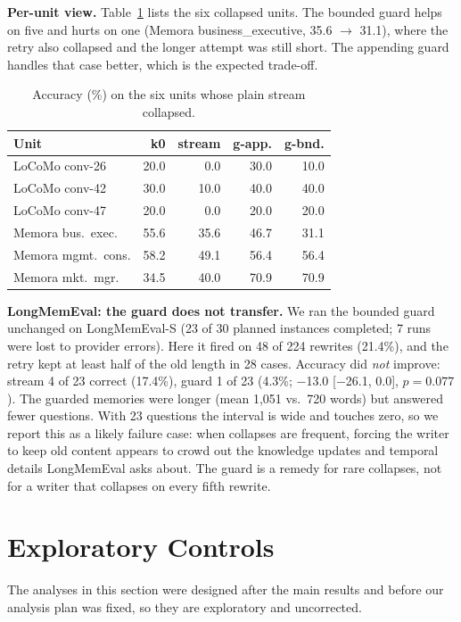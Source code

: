 \documentclass[11pt]{article}
\begin{document}
\textbf{Per-unit view.} Table~\ref{tab:units} lists the six collapsed units. The bounded guard helps on five and hurts on one (Memora business\_executive, 35.6 $\rightarrow$ 31.1), where the retry also collapsed and the longer attempt was still short. The appending guard handles that case better, which is the expected trade-off.

\begin{table}[t]
\centering\small
\setlength{\tabcolsep}{3.5pt}
\begin{tabular}{lrrrr}
\toprule
Unit & k0 & stream & g-app. & g-bnd. \\
\midrule
LoCoMo conv-26 & 20.0 & 0.0 & 30.0 & 10.0 \\
LoCoMo conv-42 & 30.0 & 10.0 & 40.0 & 40.0 \\
LoCoMo conv-47 & 20.0 & 0.0 & 20.0 & 20.0 \\
Memora bus.\ exec. & 55.6 & 35.6 & 46.7 & 31.1 \\
Memora mgmt.\ cons. & 58.2 & 49.1 & 56.4 & 56.4 \\
Memora mkt.\ mgr. & 34.5 & 40.0 & 70.9 & 70.9 \\
\bottomrule
\end{tabular}
\caption{Accuracy (\%) on the six units whose plain stream collapsed.}
\label{tab:units}
\end{table}

\textbf{LongMemEval: the guard does not transfer.} We ran the bounded guard unchanged on LongMemEval-S (23 of 30 planned instances completed; 7 runs were lost to provider errors). Here it fired on 48 of 224 rewrites (21.4\%), and the retry kept at least half of the old length in 28 cases. Accuracy did \emph{not} improve: stream 4 of 23 correct (17.4\%), guard 1 of 23 (4.3\%; $-$13.0 [$-$26.1, 0.0], $p{=}0.077$). The guarded memories were longer (mean 1,051 vs.\ 720 words) but answered fewer questions. With 23 questions the interval is wide and touches zero, so we report this as a likely failure case: when collapses are frequent, forcing the writer to keep old content appears to crowd out the knowledge updates and temporal details LongMemEval asks about. The guard is a remedy for rare collapses, not for a writer that collapses on every fifth rewrite.

\section{Exploratory Controls}\label{sec:explore}
The analyses in this section were designed after the main results and before our analysis plan was fixed, so they are exploratory and uncorrected.
\end{document}

